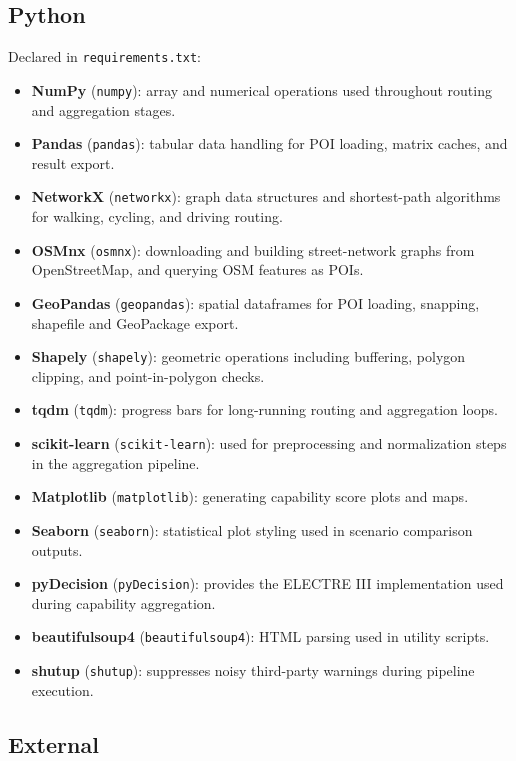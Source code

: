 \documentclass[11pt]{article}
\begin{document}
\subsection*{Python}

Declared in \texttt{requirements.txt}:

\begin{itemize}
  \item \textbf{NumPy} (\texttt{numpy}): array and numerical operations used throughout routing and aggregation stages.
  \item \textbf{Pandas} (\texttt{pandas}): tabular data handling for POI loading, matrix caches, and result export.
  \item \textbf{NetworkX} (\texttt{networkx}): graph data structures and shortest-path algorithms for walking, cycling, and driving routing.
  \item \textbf{OSMnx} (\texttt{osmnx}): downloading and building street-network graphs from OpenStreetMap, and querying OSM features as POIs.
  \item \textbf{GeoPandas} (\texttt{geopandas}): spatial dataframes for POI loading, snapping, shapefile and GeoPackage export.
  \item \textbf{Shapely} (\texttt{shapely}): geometric operations including buffering, polygon clipping, and point-in-polygon checks.
  \item \textbf{tqdm} (\texttt{tqdm}): progress bars for long-running routing and aggregation loops.
  \item \textbf{scikit-learn} (\texttt{scikit-learn}): used for preprocessing and normalization steps in the aggregation pipeline.
  \item \textbf{Matplotlib} (\texttt{matplotlib}): generating capability score plots and maps.
  \item \textbf{Seaborn} (\texttt{seaborn}): statistical plot styling used in scenario comparison outputs.
  \item \textbf{pyDecision} (\texttt{pyDecision}): provides the ELECTRE III implementation used during capability aggregation.
  \item \textbf{beautifulsoup4} (\texttt{beautifulsoup4}): HTML parsing used in utility scripts.
  \item \textbf{shutup} (\texttt{shutup}): suppresses noisy third-party warnings during pipeline execution.
\end{itemize}

\subsection*{External}
\end{document}
